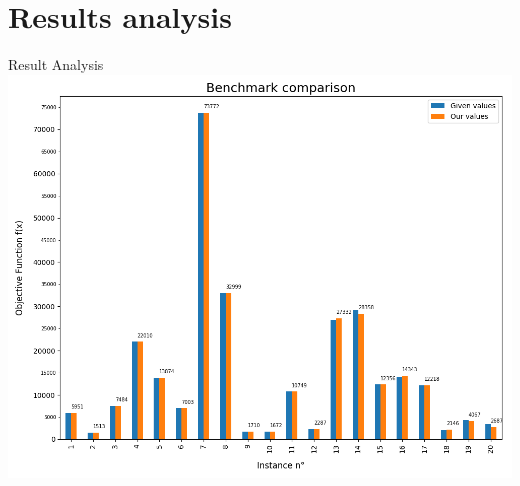 \documentclass[12pt]{beamer}
\begin{document}
  \section{Results analysis}
  \begin{frame}[fragile]{Result Analysis}
    \includegraphics[scale=0.4]{res/benchmarkComparison}
  \end{frame}
\end{document}
